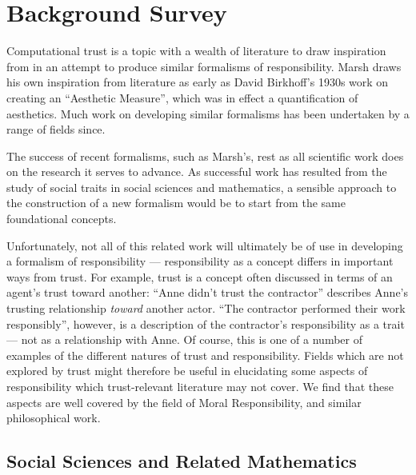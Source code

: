 \section{Background Survey}\label{sec:background_survey}

Computational trust is a topic with a wealth of literature to draw inspiration from in an attempt to produce similar formalisms of responsibility. Marsh \parencite{Marsh1994FormalisingConcept} draws his own inspiration from literature as early as David Birkhoff's 1930s work on creating an ``Aesthetic Measure'', which was in effect a quantification of aesthetics. Much work on developing similar formalisms has been undertaken by a range of fields since.\par

The success of recent formalisms, such as Marsh's, rest as all scientific work does on the research it serves to advance. As successful work has resulted from the study of social traits in social sciences and mathematics, a sensible approach to the construction of a new formalism would be to start from the same foundational concepts.\par

Unfortunately, not all of this related work will ultimately be of use in developing a formalism of responsibility --- responsibility as a concept differs in important ways from trust. For example, trust is a concept often discussed in terms of an agent's trust toward another: ``Anne didn't trust the contractor'' describes Anne's trusting relationship \emph{toward} another actor. ``The contractor performed their work responsibly'', however, is a description of the contractor's responsibility as a trait --- not as a relationship with Anne. Of course, this is one of a number of examples of the different natures of trust and responsibility. Fields which are not explored by trust might therefore be useful in elucidating some aspects of responsibility which trust-relevant literature may not cover. We find that these aspects are well covered by the field of Moral Responsibility, and similar philosophical work.

\subsection{Social Sciences and Related Mathematics}
